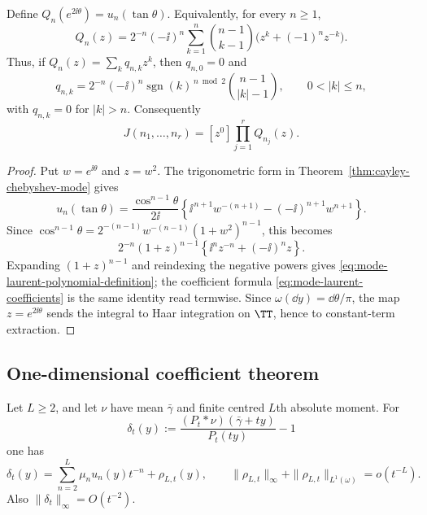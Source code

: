 \begin{theorem}%
\label{thm:finite-fourier-mode-integral-algorithm}
Define \(Q_n(e^{2\ii\theta})=u_n(\tan\theta)\).  Equivalently, for every
\(n\ge1\),
\begin{equation}\label{eq:mode-laurent-polynomial-definition}
Q_n(z)=2^{-n}(-\ii)^n
\sum_{k=1}^{n}\binom{n-1}{k-1}
\bigl(z^k+(-1)^nz^{-k}\bigr).
\end{equation}
Thus, if \(Q_n(z)=\sum_kq_{n,k}z^k\), then \(q_{n,0}=0\) and
\begin{equation}\label{eq:mode-laurent-coefficients}
q_{n,k}=
2^{-n}(-\ii)^n\operatorname{sgn}(k)^{\,n\bmod2}
\binom{n-1}{|k|-1},
\qquad 0<|k|\le n,
\end{equation}
with \(q_{n,k}=0\) for \(|k|>n\).
Consequently
\begin{equation}\label{eq:mode-integral-constant-term}
J(n_1,\ldots,n_r)=[z^0]\prod_{j=1}^r Q_{n_j}(z).
\end{equation}
\end{theorem}

\begin{proof}
Put \(w=e^{\ii\theta}\) and \(z=w^2\).  The trigonometric form in
Theorem~\ref{thm:cayley-chebyshev-mode} gives
\[
u_n(\tan\theta)
=\frac{\cos^{n-1}\theta}{2\ii}
\left\{\ii^{\,n+1}w^{-(n+1)}
-(-\ii)^{n+1}w^{n+1}\right\}.
\]
Since
\(\cos^{n-1}\theta=2^{-(n-1)}w^{-(n-1)}(1+w^2)^{n-1}\), this becomes
\[
2^{-n}(1+z)^{n-1}
\left\{\ii^nz^{-n}+(-\ii)^nz\right\}.
\]
Expanding \((1+z)^{n-1}\) and reindexing the negative powers gives
\eqref{eq:mode-laurent-polynomial-definition}; the coefficient formula
\eqref{eq:mode-laurent-coefficients} is the same identity read termwise.
Since \(\omega(\dd y)=\dd\theta/\pi\), the map \(z=e^{2\ii\theta}\) sends
the integral to Haar integration on \(\TT\), hence to constant-term
extraction.
\end{proof}

\subsection{One-dimensional coefficient theorem}

\begin{lemma}%
\label{lem:exact-moment-density-truncation}
Let \(L\ge2\), and let \(\nu\) have mean \(\bar{\gamma}\) and finite centred
\(L\)th absolute moment.  For
\[
\delta_t(y):=
\frac{(P_t*\nu)(\bar{\gamma}+ty)}{P_t(ty)}-1
\]
one has
\begin{equation}\label{eq:exact-moment-density-truncation}
\delta_t(y)=\sum_{n=2}^{L}\mu_nu_n(y)t^{-n}+\rho_{L,t}(y),
\qquad
\|\rho_{L,t}\|_{\infty}+\|\rho_{L,t}\|_{L^1(\omega)}=o(t^{-L}).
\end{equation}
Also \(\|\delta_t\|_\infty=O(t^{-2})\).
\end{lemma}

